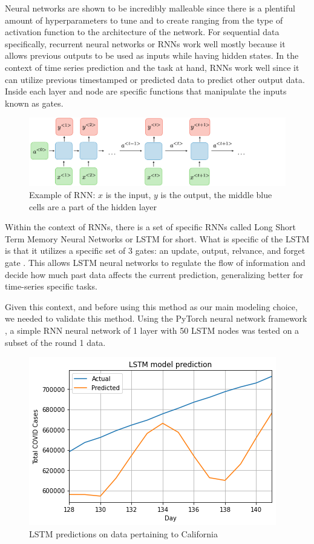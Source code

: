\documentclass[sigconf,nonacm]{acmart}
\begin{document}
Neural networks are shown to be incredibly malleable since there is a plentiful
amount of hyperparameters to tune and to create ranging from the type of
activation function to the architecture of the network. For sequential data
specifically, recurrent neural networks or RNNs work well mostly because it
allows previous outputs to be used as inputs while having hidden states.  
In the context of time series prediction and the task at hand, RNNs work well
since it can utilize previous timestamped or predicted data to predict other
output data. Inside each layer and node are specific functions that manipulate
the inputs known as gates.

\begin{figure}
  \centering
  \includegraphics[width=\linewidth]{figures/architecture-rnn-ltr.png}
  \caption{Example of RNN: $x$ is the input, $y$ is the output, the middle blue
  cells are a part of the hidden layer}
  \label{fig:rnn}
\end{figure}

Within the context of RNNs, there is a set of specific RNNs called Long Short
Term Memory Neural Networks or LSTM for short. What is specific of the LSTM is
that it utilizes a specific set of 3 gates: an update, output, relvance, and
forget gate \cite{LSTMlecture}. This allows LSTM neural networks to regulate
the flow of information and decide how much past data affects the current
prediction, generalizing better for time-series specific tasks.

Given this context, and before using this method as our main modeling choice,
we needed to validate this method. Using the PyTorch neural network framework
\cite{Pytorch}, a simple RNN neural network of 1 layer with 50 LSTM nodes was
tested on a subset of the round 1 data. 
\begin{figure}
  \centering
  \includegraphics[width=\linewidth]{figures/LSTMPytorch.png}
  \caption{LSTM predictions on data pertaining to California}
  \label{fig:LSTM_trial}
\end{figure} 
\end{document}
